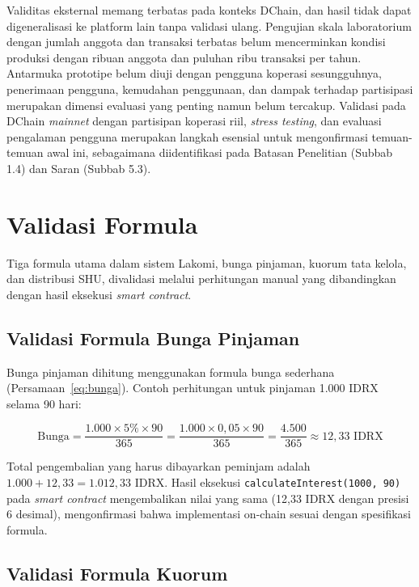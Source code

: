 Validitas eksternal memang terbatas pada konteks DChain, dan hasil tidak dapat digeneralisasi ke platform lain tanpa validasi ulang. Pengujian skala laboratorium dengan jumlah anggota dan transaksi terbatas belum mencerminkan kondisi produksi dengan ribuan anggota dan puluhan ribu transaksi per tahun. Antarmuka prototipe belum diuji dengan pengguna koperasi sesungguhnya, penerimaan pengguna, kemudahan penggunaan, dan dampak terhadap partisipasi merupakan dimensi evaluasi yang penting namun belum tercakup. Validasi pada DChain \textit{mainnet} dengan partisipan koperasi riil, \textit{stress testing}, dan evaluasi pengalaman pengguna merupakan langkah esensial untuk mengonfirmasi temuan-temuan awal ini, sebagaimana diidentifikasi pada Batasan Penelitian (Subbab 1.4) dan Saran (Subbab 5.3).

\section{Validasi Formula}

Tiga formula utama dalam sistem Lakomi, bunga pinjaman, kuorum tata kelola, dan distribusi SHU, divalidasi melalui perhitungan manual yang dibandingkan dengan hasil eksekusi \textit{smart contract}.

\subsection{Validasi Formula Bunga Pinjaman}

Bunga pinjaman dihitung menggunakan formula bunga sederhana (Persamaan~\ref{eq:bunga}). Contoh perhitungan untuk pinjaman 1.000 IDRX selama 90 hari:

\begin{equation}
\text{Bunga} = \frac{1.000 \times 5\% \times 90}{365} = \frac{1.000 \times 0,05 \times 90}{365} = \frac{4.500}{365} \approx 12,33 \text{ IDRX}
\end{equation}

Total pengembalian yang harus dibayarkan peminjam adalah $1.000 + 12,33 = 1.012,33$ IDRX. Hasil eksekusi \texttt{calculateInterest(1000, 90)} pada \textit{smart contract} mengembalikan nilai yang sama (12,33 IDRX dengan presisi 6 desimal), mengonfirmasi bahwa implementasi on-chain sesuai dengan spesifikasi formula.

\subsection{Validasi Formula Kuorum}

